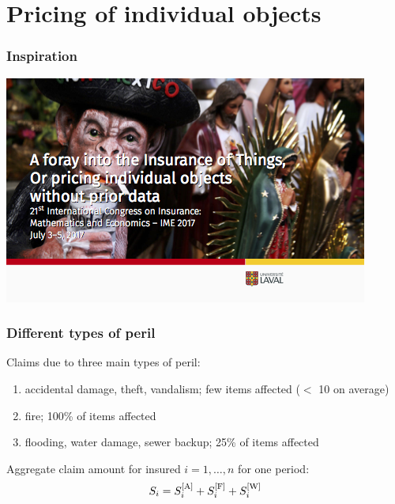\section{Pricing of individual objects}

\begin{frame}
  \frametitle{Inspiration}

  \begin{center}
    \includegraphics[width=0.8\linewidth,keepaspectratio,frame]{ime-2017-insurance-of-things} \\
  \end{center}
\end{frame}

\begin{frame}
  \frametitle{Different types of peril}

  \begin{assumption}
    Claims due to three main types of peril:
    \begin{enumerate}
    \item accidental damage, theft, vandalism; \alert{few} items affected ($<$ 10 on average)
    \item fire; \alert{100\%} of items affected
    \item flooding, water damage, sewer backup; \alert{25\%} of items
      affected
    \end{enumerate}
  \end{assumption}
  \pause

  \begin{consequence}
    Aggregate claim amount for insured $i = 1, \dots, n$ for one period:
    \begin{equation*}
      S_i = S_i^{[\text{A}]} + S_i^{[\text{F}]} + S_i^{[\text{W}]}
    \end{equation*}
  \end{consequence}
\end{frame}

